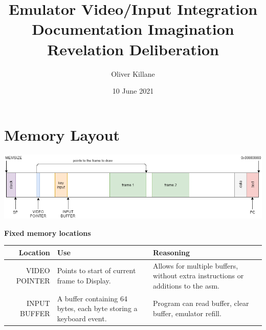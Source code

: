 \documentclass[11pt]{article}
\begin{document}
\title{Emulator Video/Input Integration Documentation Imagination Revelation Deliberation}
\author{Oliver Killane}
\date{10 June 2021}

\maketitle

    \section*{Memory Layout}
        \begin{center}
            \includegraphics[width=\textwidth]{memory layout}
        \end{center}
        \centerline{\textbf{Fixed memory locations}}
        \begin{tabular}{r p{7cm} p{7cm}}
            Location & Use & Reasoning \\
            \hline
            VIDEO POINTER & Points to start of current frame to Display. & Allows for multiple buffers, without extra instructions or additions to the asm. \\
            INPUT BUFFER & A buffer containing 64 bytes, each byte storing a keyboard event. & Program can read buffer, clear buffer, emulator refill. \\
        \end{tabular}
    
\end{document}
